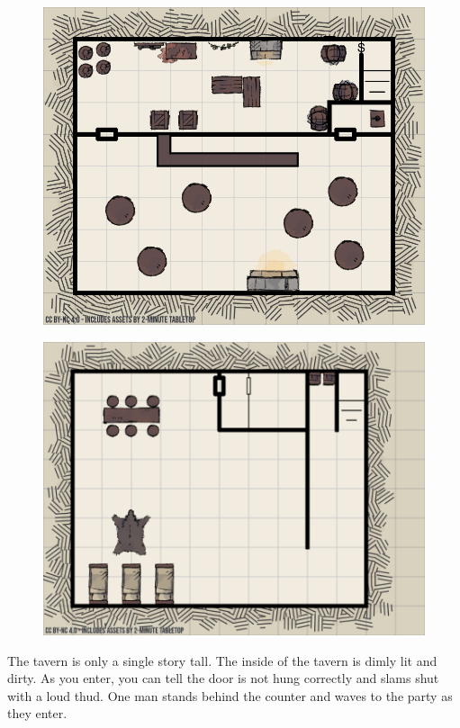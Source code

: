 \documentclass[10pt,twocolumn,openany,nodeprecatedcode,bg=none,inline]{dndbook}
\begin{document}
\begin{figure}[ht]
  \centering
  \includegraphics[height=.4\textheight]{assets/innUpstairs.png}
\end{figure}
\begin{figure}[ht]
  \centering
  \includegraphics[height=.4\textheight]{assets/innDownstairs.png}
\end{figure}

The tavern is only a single story tall.
The inside of the tavern is dimly lit and dirty.
As you enter, you can tell the door is not hung correctly and slams shut with a loud thud.
One man stands behind the counter and waves to the party as they enter.
\end{document}
